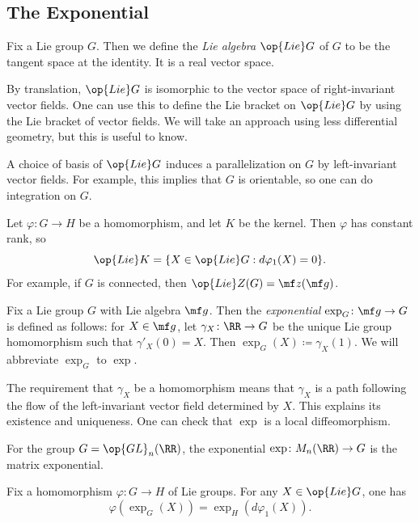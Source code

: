 \documentclass{article}
\begin{document}
\subsection{The Exponential} \label{subsec:exp}
\begin{definition}
	Fix a Lie group $G$. Then we define the \textit{Lie algebra} $\op{Lie}G$ of $G$ to be the tangent space at the identity. It is a real vector space.
\end{definition}
\begin{remark}
	By translation, $\op{Lie}G$ is isomorphic to the vector space of right-invariant vector fields. One can use this to define the Lie bracket on $\op{Lie}G$ by using the Lie bracket of vector fields. We will take an approach using less differential geometry, but this is useful to know.
\end{remark}
\begin{remark}
	A choice of basis of $\op{Lie}G$ induces a parallelization on $G$ by left-invariant vector fields. For example, this implies that $G$ is orientable, so one can do integration on $G$.
\end{remark}
\begin{example} \label{ex:lie-from-hom}
	Let $\varphi\colon G\to H$ be a homomorphism, and let $K$ be the kernel. Then $\varphi$ has constant rank, so
	\[\op{Lie}K=\{X\in\op{Lie}G:d\varphi_1(X)=0\}.\]
	For example, if $G$ is connected, then $\op{Lie}Z(G)=\mf z(\mf g)$.
\end{example}
\begin{definition}[exponential]
	Fix a Lie group $G$ with Lie algebra $\mf g$. Then the \textit{exponential} $\exp_G\colon\mf g\to G$ is defined as follows: for $X\in\mf g$, let $\gamma_X\colon\RR\to G$ be the unique Lie group homomorphism such that $\gamma'_X(0)=X$. Then $\exp_G(X)\coloneqq\gamma_X(1)$. We will abbreviate $\exp_G$ to $\exp$.
\end{definition}
\begin{remark}
	The requirement that $\gamma_X$ be a homomorphism means that $\gamma_X$ is a path following the flow of the left-invariant vector field determined by $X$. This explains its existence and uniqueness. One can check that $\exp$ is a local diffeomorphism.
\end{remark}
\begin{example}
	For the group $G=\op{GL}_n(\RR)$, the exponential $\exp\colon M_n(\RR)\to G$ is the matrix exponential.
\end{example}
\begin{lemma} \label{lem:exp-hom}
	Fix a homomorphism $\varphi\colon G\to H$ of Lie groups. For any $X\in\op{Lie}G$, one has
	\[\varphi(\exp_G(X))=\exp_H(d\varphi_1(X)).\] 
\end{lemma}
\end{document}
